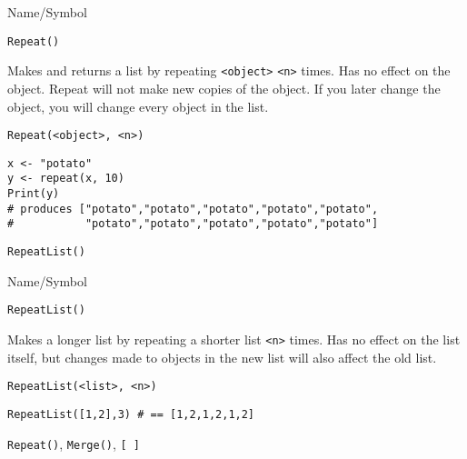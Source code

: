 \begin{desc}{Name/Symbol}
\item[Name/Symbol] 	\verb+Repeat()+

\item[Description] 	Makes and returns a list by repeating \verb+<object>+ \verb+<n>+ times. 
		Has no effect on the object. Repeat will not make new copies 
		of the object. If you later change the object, 
		you will change every object in the list.

\item[Usage]       	
\begin{verbatim}
Repeat(<object>, <n>)
\end{verbatim}
	    	
\item[Example]     	
\begin{verbatim}
x <- "potato"
y <- repeat(x, 10)
Print(y)
# produces ["potato","potato","potato","potato","potato", 
#           "potato","potato","potato","potato","potato"]
\end{verbatim}
	     	     
\item[See Also]    	\verb+RepeatList()+
\end{desc}

\rl


\begin{desc}{Name/Symbol}
\item[Name/Symbol] 	\verb+RepeatList()+

\item[Description]  	Makes a longer list by repeating a shorter list \verb+<n>+ times. 
	Has no effect on the list itself, but changes made to objects 
	in the new list will also affect the old list.

\item[Usage]       	
\begin{verbatim}
RepeatList(<list>, <n>)
\end{verbatim}

\item[Example]     	
\begin{verbatim}
RepeatList([1,2],3) # == [1,2,1,2,1,2]
\end{verbatim}

\item[See Also]    	\verb+Repeat()+, \verb+Merge()+, \verb+[ ]+
\end{desc}

\rl



